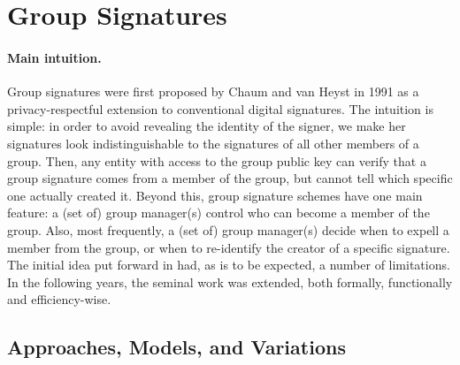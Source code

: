 \section{Group Signatures}
\label{sec:gs}

\paragraph{Main intuition.}
%
Group signatures were first proposed by Chaum and van Heyst in 1991 \cite{ch91}
as a privacy-respectful extension to conventional digital signatures.
The intuition is simple: in order to avoid revealing the identity of the signer,
we make her signatures look indistinguishable to the signatures of all other
members of a group. Then, any entity with access to the group public key can
verify that a group signature comes from a member of the group, but cannot
tell which specific one actually created it.
%
Beyond this, group signature schemes have one main feature: a (set of) group
manager(s) control who can become a member of the group. Also, most frequently,
a (set of) group manager(s) decide when to expell a member from the group, or
when to re-identify the creator of a specific signature.
%
The initial idea put forward in \cite{ch91} had, as is to be expected, a number
of limitations. In the following years, the seminal work was extended, both
formally, functionally and efficiency-wise.

\subsection{Approaches, Models, and Variations}
\label{ssec:gsapproach}

